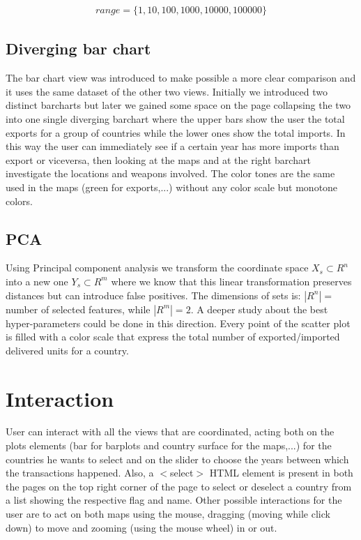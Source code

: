 \documentclass{article}
\begin{document}
\begin{multicols}{2}
\begin{align}
	range=\{1,10,100,1000,10000,100000\}
\end{align}

\subsection{Diverging bar chart}

The bar chart view was introduced to make possible a more clear comparison and it uses the same dataset of the other two views. Initially we introduced two distinct barcharts but later we gained some space on the page collapsing the two into one single diverging barchart where the upper bars show the user the total exports for a group of countries while the lower ones show the total imports. In this way the user can immediately see  if a certain year has more imports than export or viceversa, then looking at the maps and at the right barchart investigate the locations and weapons involved. The color tones are the same used in the maps (green for exports,...) without any color scale but monotone colors.  

\subsection{PCA}
Using Principal component analysis we transform the coordinate space $X_s \subset R^n$ into a new one $Y_s \subset R^m$ where we know that this linear transformation preserves distances but can introduce false positives. The dimensions of sets is: $|R^n|=$ number of selected features, while $|R^m|=2$.
A deeper study about the best hyper-parameters could be done in this direction. 
Every point of the scatter plot is filled with a color scale that express the total number of exported/imported delivered units for a country.

\section{Interaction}
User can interact with all the views 
that are coordinated, acting both on the plots elements (bar for barplots and country surface for the maps,...) for the countries he wants to select and on the slider to choose the years between which the transactions happened.
Also, a $<$select$>$ HTML element is present in both the pages on the top right corner of the page to select or deselect a country from a list showing the respective flag and name. Other possible interactions for the user are to act on both maps using the mouse, dragging (moving while click down) to move and zooming (using the mouse wheel) in or out. 


\end{multicols}
\end{document}
